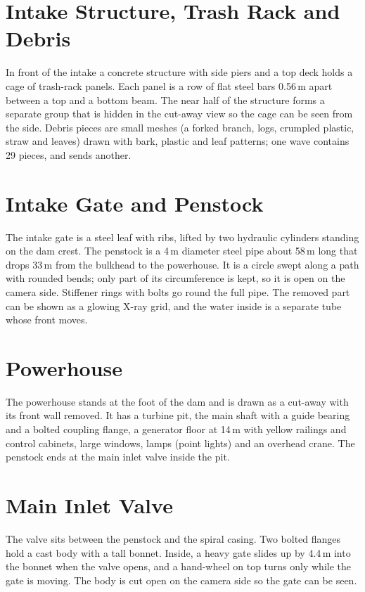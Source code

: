 \documentclass[11pt,a4paper]{report}
\newcommand{\key}[1]{\fbox{\footnotesize\ttfamily #1}}
\begin{document}
\section{Intake Structure, Trash Rack and Debris}

In front of the intake a concrete structure with side piers and a top deck holds a cage
of trash-rack panels. Each panel is a row of flat steel bars 0.56\,m apart between a top
and a bottom beam. The near half of the structure forms a separate group that is
hidden in the cut-away view so the cage can be seen from the side. Debris pieces are
small meshes (a forked branch, logs, crumpled plastic, straw and leaves) drawn with bark,
plastic and leaf patterns; one wave contains 29 pieces, and \key{T} sends another.

\section{Intake Gate and Penstock}

The intake gate is a steel leaf with ribs, lifted by two hydraulic cylinders standing on
the dam crest. The penstock is a 4\,m diameter steel pipe about 58\,m long that drops
33\,m from the bulkhead to the powerhouse. It is a circle swept along a path with
rounded bends; only part of its circumference is kept, so it is open on the camera side.
Stiffener rings with bolts go round the full pipe. The removed part can be shown as a
glowing X-ray grid, and the water inside is a separate tube whose front moves.

\section{Powerhouse}

The powerhouse stands at the foot of the dam and is drawn as a cut-away with its front
wall removed. It has a turbine pit, the main shaft with a guide bearing and a bolted
coupling flange, a generator floor at 14\,m with yellow railings and control cabinets,
large windows, lamps (point lights) and an overhead crane. The penstock ends at the
main inlet valve inside the pit.

\section{Main Inlet Valve}

The valve sits between the penstock and the spiral casing. Two bolted flanges hold a
cast body with a tall bonnet. Inside, a heavy gate slides up by 4.4\,m into the bonnet
when the valve opens, and a hand-wheel on top turns only while the gate is moving. The
body is cut open on the camera side so the gate can be seen.
\end{document}
